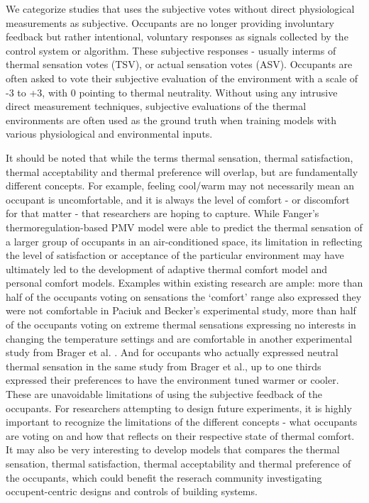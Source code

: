 
We categorize studies that uses the subjective votes without direct physiological measurements as subjective. Occupants are no longer providing involuntary feedback but rather intentional, voluntary responses as signals collected by the control system or algorithm. These subjective responses - usually interms of thermal sensation votes (TSV), or actual sensation votes (ASV). Occupants are often asked to vote their subjective evaluation of the environment with a scale of -3 to +3, with 0 pointing to thermal neutrality. Without using any intrusive direct measurement techniques, subjective evaluations of the thermal environments are often used as the ground truth when training models with various physiological and environmental inputs\cite{bermejo_design_2012}. 

It should be noted that while the terms thermal sensation, thermal satisfaction, thermal acceptability and thermal preference will overlap, but are fundamentally different concepts. For example, feeling cool/warm may not necessarily mean an occupant is uncomfortable, and it is always the level of comfort - or discomfort for that matter - that researchers are hoping to capture. While Fanger's thermoregulation-based PMV model were able to predict the thermal sensation of a larger group of occupants in an air-conditioned space, its limitation in reflecting the level of satisfaction or acceptance of the particular environment may  have ultimately led to the development of adaptive thermal comfort model and personal comfort models. Examples within existing research are ample: more than half of the occupants voting on sensations the `comfort' range also expressed they were not comfortable in Paciuk and Becker's experimental study\cite{charles_fangers_2003}, more than half of the occupants voting on extreme thermal sensations expressing no interests in changing the temperature settings and are comfortable in another experimental study from Brager et al. \cite{de_dear_developing_1998}. And for occupants who actually expressed neutral thermal sensation in the same study from Brager et al., up to one thirds expressed their preferences to have the environment tuned warmer or cooler. These are unavoidable limitations of using the subjective feedback of the occupants. For researchers attempting to design future experiments, it is highly important to recognize the limitations of the different concepts - what occupants are voting on and how that reflects on their respective state of thermal comfort. It may also be very interesting to develop models that compares the thermal sensation, thermal satisfaction, thermal acceptability and thermal preference of the occupants, which could benefit the reserach community investigating occupent-centric designs and controls of building systems. 

